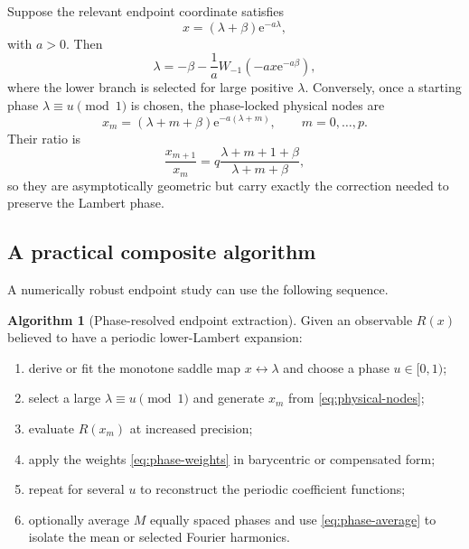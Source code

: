\documentclass[11pt,oneside]{article}
\theoremstyle{definition}
\newtheorem{algorithm}[theorem]{Algorithm}
\theoremstyle{remark}
\newcommand{\e}{\mathrm e}
\begin{document}
Suppose the relevant endpoint coordinate satisfies
\begin{equation}
 x=(\lambda+\beta)\e^{-a\lambda},                            \label{eq:lambert-node-equation}
\end{equation}
with $a>0$.  Then
\begin{equation}
 \boxed{\displaystyle
 \lambda=-\beta-\frac1a
 W_{-1}\!\left(-ax\e^{-a\beta}\right),}                    \label{eq:lambert-node-inverse}
\end{equation}
where the lower branch is selected for large positive $\lambda$.  Conversely, once a starting
phase $\lambda\equiv u\pmod1$ is chosen, the phase-locked physical nodes are
\begin{equation}
 x_m=(\lambda+m+\beta)\e^{-a(\lambda+m)},
 \qquad m=0,\ldots,p.                                       \label{eq:physical-nodes}
\end{equation}
Their ratio is
\begin{equation}
 \frac{x_{m+1}}{x_m}
 =q\frac{\lambda+m+1+\beta}{\lambda+m+\beta},               \label{eq:node-ratio}
\end{equation}
so they are asymptotically geometric but carry exactly the correction needed to preserve the
Lambert phase.

\subsection{A practical composite algorithm}

A numerically robust endpoint study can use the following sequence.

\begin{algorithm}[Phase-resolved endpoint extraction]
\label{alg:phase}
Given an observable $R(x)$ believed to have a periodic lower-Lambert expansion:
\begin{enumerate}
\item derive or fit the monotone saddle map $x\leftrightarrow\lambda$ and choose a phase
      $u\in[0,1)$;
\item select a large $\lambda\equiv u\pmod1$ and generate $x_m$ from
      \eqref{eq:physical-nodes};
\item evaluate $R(x_m)$ at increased precision;
\item apply the weights \eqref{eq:phase-weights} in barycentric or compensated form;
\item repeat for several $u$ to reconstruct the periodic coefficient functions;
\item optionally average $M$ equally spaced phases and use \eqref{eq:phase-average} to isolate
      the mean or selected Fourier harmonics.
\end{enumerate}
\end{algorithm}
\end{document}

